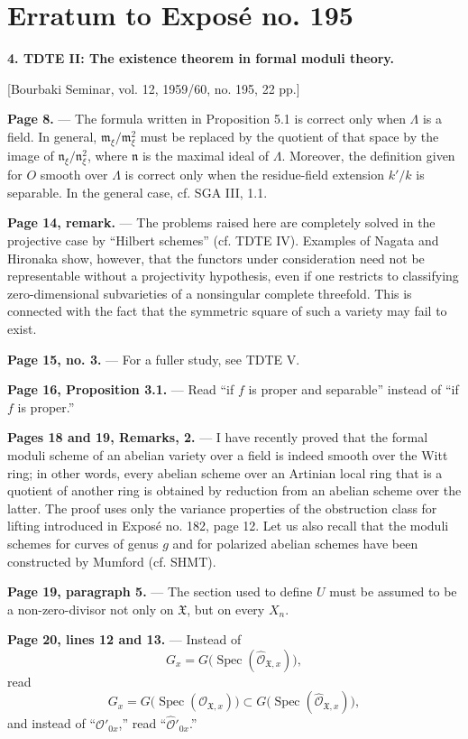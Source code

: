 \clearpage
\chapter*{Erratum to Exposé no. 195}
\setcounter{footnote}{0}

\noindent\textbf{4. TDTE II: The existence theorem in formal moduli theory.}

\begin{center}
[Bourbaki Seminar, vol. 12, 1959/60, no. 195, 22 pp.]
\end{center}

\noindent\textbf{Page 8.} --- The formula written in Proposition 5.1 is
correct only when $\Lambda$ is a field. In general,
$\mathfrak m_\xi/\mathfrak m_\xi^2$ must be replaced by the quotient of that
space by the image of $\mathfrak n_\xi/\mathfrak n_\xi^2$, where $\mathfrak n$
is the maximal ideal of $\Lambda$. Moreover, the definition given for $O$
smooth over $\Lambda$ is correct only when the residue-field extension $k'/k$
is separable. In the general case, cf. SGA III, 1.1.

\noindent\textbf{Page 14, remark.} --- The problems raised here are completely
solved in the projective case by “Hilbert schemes” (cf. TDTE IV). Examples of
Nagata and Hironaka show, however, that the functors under consideration need
not be representable without a projectivity hypothesis, even if one restricts
to classifying zero-dimensional subvarieties of a nonsingular complete
threefold. This is connected with the fact that the symmetric square of such a
variety may fail to exist.

\noindent\textbf{Page 15, no. 3.} --- For a fuller study, see TDTE V.

\noindent\textbf{Page 16, Proposition 3.1.} --- Read “if $f$ is proper and
separable” instead of “if $f$ is proper.”

\noindent\textbf{Pages 18 and 19, Remarks, 2.} --- I have recently proved that
the formal moduli scheme of an abelian variety over a field is indeed smooth
over the Witt ring; in other words, every abelian scheme over an Artinian local
ring that is a quotient of another ring is obtained by reduction from an
abelian scheme over the latter. The proof uses only the variance properties of
the obstruction class for lifting introduced in Exposé no. 182, page 12. Let
us also recall that the moduli schemes for curves of genus $g$ and for polarized
abelian schemes have been constructed by Mumford (cf. SHMT).

\noindent\textbf{Page 19, paragraph 5.} --- The section used to define $U$
must be assumed to be a non-zero-divisor not only on $\mathfrak X$, but on
every $X_n$.

\noindent\textbf{Page 20, lines 12 and 13.} --- Instead of
\[
  G_x=G\bigl(\operatorname{Spec}(\widehat{\mathcal O}_{\mathfrak X,x})\bigr),
\]
read
\[
  G_x=G\bigl(\operatorname{Spec}(\mathcal O_{\mathfrak X,x})\bigr)
  \subset
  G\bigl(\operatorname{Spec}(\widehat{\mathcal O}_{\mathfrak X,x})\bigr),
\]
and instead of “$\mathcal O'_{0x}$,” read
“$\widehat{\mathcal O}'_{0x}$.”
